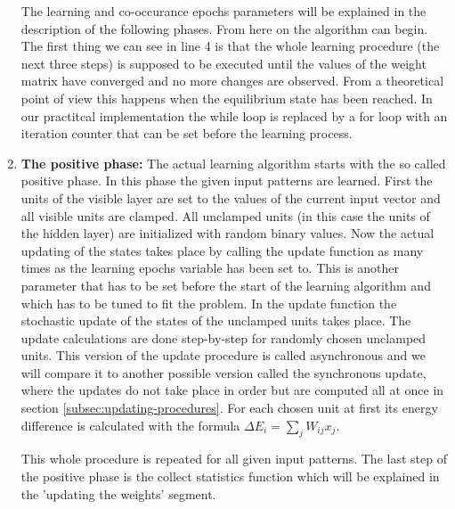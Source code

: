 \documentclass[12pt,twoside]{article}
\theoremstyle{plain}
\theoremstyle{definition}
\theoremstyle{remark}
\begin{document}
\begin{enumerate}
        The learning and co-occurance epochs parameters will be explained in the description of the following phases.\newline
        From here on the algorithm can begin. The first thing we can see in line 4 is that the whole learning procedure (the next three steps) is
        supposed to be executed until the values of the weight matrix have converged and no more changes are observed.
        From a theoretical point of view this happens when the equilibrium state has been reached. 
        In our practitcal implementation the while loop is replaced by a for loop with an iteration counter that can be set before the learning process.
    \item \textbf{The positive phase:}\newline
        The actual learning algorithm starts with the so called positive phase. In this phase the given input patterns are learned.
        First the units of the visible layer are set to the values of the current input vector and all visible units are clamped.
        All unclamped units (in this case the units of the hidden layer) are initialized with random binary values.
        Now the actual updating of the states takes place by calling the update function as many times as the learning epochs variable has been set to.
        This is another parameter that has to be set before the start of the learning algorithm and which has to be tuned to fit the problem.\newline
        In the update function the stochastic update of the states of the unclamped units takes place. The update calculations are done
        step-by-step for randomly chosen unclamped units. This version of the update procedure is called asynchronous and we will
        compare it to another possible version called the synchronous update, where the updates do not take place in order
        but are computed all at once in section \cref{subsec:updating-procedures}.\newline
        For each chosen unit at first its energy difference is calculated with the formula $\Delta E_i = \sum_j W_{ij} x_j$. 
        

        This whole procedure is repeated for all given input patterns. The last step of the positive phase is the collect statistics function which will be explained in
        the 'updating the weights' segment.



\end{enumerate}
\end{document}
